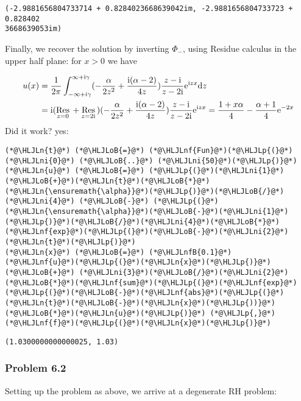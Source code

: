 \documentclass[12pt,landscape]{article}
\newcommand{\HLJLn}[1]{#1}
\newcommand{\HLJLnf}[1]{\textcolor[RGB]{66,102,213}{#1}}
\newcommand{\HLJLnfB}[1]{\textcolor[RGB]{59,151,46}{#1}}
\newcommand{\HLJLni}[1]{\textcolor[RGB]{59,151,46}{#1}}
\newcommand{\HLJLoB}[1]{\textcolor[RGB]{102,102,102}{\textbf{#1}}}
\newcommand{\HLJLp}[1]{#1}
\def\D{ {\rm d} }
\def\I{ {\rm i} }
\def\E{ {\rm e} }
\def\Res_#1{\underset{#1}{\rm Res}\,}
\def\dz{\D z}
\begin{document}
{\begin{lstlisting}
(-2.9881656804733714 + 0.8284023668639042im, -2.9881656804733723 + 0.828402
3668639053im)
\end{lstlisting}


Finally, we recover the solution by inverting $\Phi_-$, using Residue calculus in the upper half plane: for $x > 0$ we have


\begin{align*}
u(x) &= {1 \over 2 \pi} \int_{-\infty+ \I \gamma}^{\infty + \I \gamma} (-{\alpha \over 2 z^2}+{\I (\alpha-2) \over 4 z}  ) {z - \I  \over z - 2\I}  \E^{\I z x}  \dz \\
&= \I (\Res_{z = 0} + \Res_{z = 2\I}) (-{\alpha \over 2 z^2}+{\I (\alpha-2) \over 4 z}  ) {z - \I  \over z - 2\I}  \E^{\I z x} = {1+x \alpha \over 4} - {\alpha+1 \over 4} \E^{-2 x}
\end{align*}
Did it work? yes:


\begin{lstlisting}
(*@\HLJLn{t}@*) (*@\HLJLoB{=}@*) (*@\HLJLnf{Fun}@*)(*@\HLJLp{(}@*)(*@\HLJLni{0}@*) (*@\HLJLoB{..}@*) (*@\HLJLni{50}@*)(*@\HLJLp{)}@*)
(*@\HLJLn{u}@*) (*@\HLJLoB{=}@*) (*@\HLJLp{(}@*)(*@\HLJLni{1}@*)(*@\HLJLoB{+}@*)(*@\HLJLn{t}@*)(*@\HLJLoB{*}@*)(*@\HLJLn{\ensuremath{\alpha}}@*)(*@\HLJLp{)}@*)(*@\HLJLoB{/}@*)(*@\HLJLni{4}@*) (*@\HLJLoB{-}@*) (*@\HLJLp{(}@*)(*@\HLJLn{\ensuremath{\alpha}}@*)(*@\HLJLoB{-}@*)(*@\HLJLni{1}@*)(*@\HLJLp{)}@*)(*@\HLJLoB{/}@*)(*@\HLJLni{4}@*)(*@\HLJLoB{*}@*)(*@\HLJLnf{exp}@*)(*@\HLJLp{(}@*)(*@\HLJLoB{-}@*)(*@\HLJLni{2}@*)(*@\HLJLn{t}@*)(*@\HLJLp{)}@*)
(*@\HLJLn{x}@*) (*@\HLJLoB{=}@*) (*@\HLJLnfB{0.1}@*)
(*@\HLJLnf{u}@*)(*@\HLJLp{(}@*)(*@\HLJLn{x}@*)(*@\HLJLp{)}@*) (*@\HLJLoB{+}@*) (*@\HLJLni{3}@*)(*@\HLJLoB{/}@*)(*@\HLJLni{2}@*)(*@\HLJLoB{*}@*)(*@\HLJLnf{sum}@*)(*@\HLJLp{(}@*)(*@\HLJLnf{exp}@*)(*@\HLJLp{(}@*)(*@\HLJLoB{-}@*)(*@\HLJLnf{abs}@*)(*@\HLJLp{(}@*)(*@\HLJLn{t}@*)(*@\HLJLoB{-}@*)(*@\HLJLn{x}@*)(*@\HLJLp{))}@*)(*@\HLJLoB{*}@*)(*@\HLJLn{u}@*)(*@\HLJLp{)}@*) (*@\HLJLp{,}@*) (*@\HLJLnf{f}@*)(*@\HLJLp{(}@*)(*@\HLJLn{x}@*)(*@\HLJLp{)}@*)
\end{lstlisting}

\begin{lstlisting}
(1.0300000000000025, 1.03)
\end{lstlisting}


\subsubsection{Problem 6.2}
Setting up the problem as above, we arrive at a degenerate RH problem:

}
\end{document}
